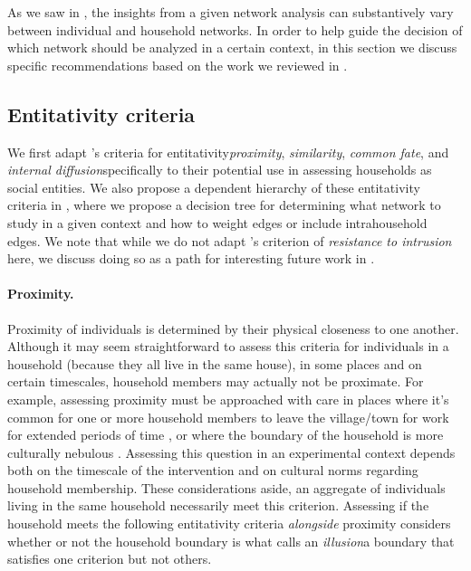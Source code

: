 As we saw in , the insights from a given network analysis can substantively vary between individual and household networks. In order to help guide the decision of which network should be analyzed in a certain context, in this section we discuss specific recommendations based on the work we reviewed in . 

\subsection{Entitativity criteria} \label{subsec:entitativity_rec}
We first adapt \citeauthor{campbell1958common}'s criteria for entitativity\textemdash \textit{proximity}, \textit{similarity}, \textit{common fate}, and \textit{internal diffusion}\textemdash specifically to their potential use in assessing households as social entities. We also propose a dependent hierarchy of these entitativity criteria in , where we propose a decision tree for determining what network to study in a given context and how to weight edges or include intrahousehold edges. We note that while we do not adapt \citeauthor{campbell1958common}'s criterion of \textit{resistance to intrusion} here, we discuss doing so as a path for interesting future work in .

\paragraph{Proximity.}
Proximity of individuals is determined by their physical closeness to one another. Although it may seem straightforward to assess this criteria for individuals in a household (because they all live in the same house), in some places and on certain timescales, household members may actually not be proximate. For example, assessing proximity must be approached with care in places where it’s common for one or more household members to leave the village/town for work for extended periods of time \citep[see][]{niehof2011conceptualizing}, or where the boundary of the household is more culturally nebulous \citep{yotebieng2018household}. Assessing this question in an experimental context depends both on the timescale of the intervention and on cultural norms regarding household membership. These considerations aside, an aggregate of individuals living in the same household necessarily meet this criterion. Assessing if the household meets the following entitativity criteria \textit{alongside} proximity considers whether or not the household boundary is what \citeauthor{campbell1958common} calls an \textit{illusion}\textemdash a boundary that satisfies one criterion but not others.

